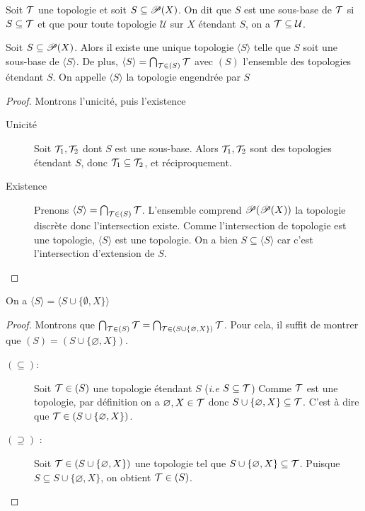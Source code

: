 \begin{definition}
Soit $ \mathcal{T}$ une topologie et soit $S\subseteq\mathscr{P}(X)$. On dit que $S$ est une sous-base de $\mathcal{T}$ si $S\subseteq \mathcal{T}$ et que pour toute topologie $\mathcal U$ sur $X$ étendant $S$, on a $\mathcal{T}\subseteq\mathcal U$.
\end{definition}
\begin{proposition}
    Soit $S\subseteq\mathscr{P}(X)$. Alors il existe une unique topologie $\langle S\rangle$ telle que $S$ soit une sous-base de $\langle S\rangle$. De plus, $\langle S\rangle = \bigcap_{\mathcal{T}\in (S)}\mathcal{T}$ avec $(S)$ l'ensemble des topologies étendant $S$. On appelle $\langle S\rangle $ la topologie engendrée par $S$
\end{proposition}
\begin{proof} Montrons l'unicité, puis l'existence
\begin{description}
    \item[Unicité] Soit $\mathcal{T}_1,\mathcal{T}_2$ dont $S$ est une sous-base. Alors $\mathcal{T}_1,\mathcal{T}_2$ sont des topologies étendant $S$, donc $\mathcal{T}_1\subseteq\mathcal{T}_2$, et réciproquement.
    \item[Existence] Prenons $\langle S\rangle = \bigcap_{\mathcal{T}\in (S)}\mathcal{T}$. L'ensemble comprend $\mathscr{P}(\mathscr{P}(X))$ la topologie discrète donc l'intersection existe. Comme l'intersection de topologie est une topologie, $\langle S\rangle$ est une topologie. On a bien $S\subseteq\langle S\rangle$ car c'est l'intersection d'extension de $S$.
\end{description}
\end{proof}
\begin{lemme}On a
$\langle S\rangle=\langle S\cup\{\emptyset,X\}\rangle$
\end{lemme}
\begin{proof}
    Montrons que $\bigcap_{\mathcal{T}\in (S)}\mathcal{T}=\bigcap_{\mathcal{T}\in (S\cup\{\varnothing,X\})}\mathcal{T}$. Pour cela, il suffit de montrer que $(S)=(S\cup \{\varnothing,X\})$.
    \begin{description}
        \item[$(\subseteq)$:] Soit $\mathcal{T}\in (S)$ une topologie étendant $S$ (\textit{i.e} $S\subseteq \mathcal{T}$) Comme $\mathcal{T}$ est une topologie, par définition on a $\varnothing, X\in \mathcal{T}$ donc $S\cup\{\varnothing,X\}\subseteq \mathcal{T}$. C'est à dire que $\mathcal{T}\in (S\cup\{\varnothing,X\})$.
        \item[$(\supseteq)$ :] Soit $\mathcal{T}\in (S\cup\{\varnothing,X\})$ une topologie tel que $S\cup\{\varnothing,X\}\subseteq\mathcal{T}$. Puisque $S\subseteq S\cup\{\varnothing,X\}$, on obtient $\mathcal{T}\in (S)$.
    \end{description}
\end{proof}
